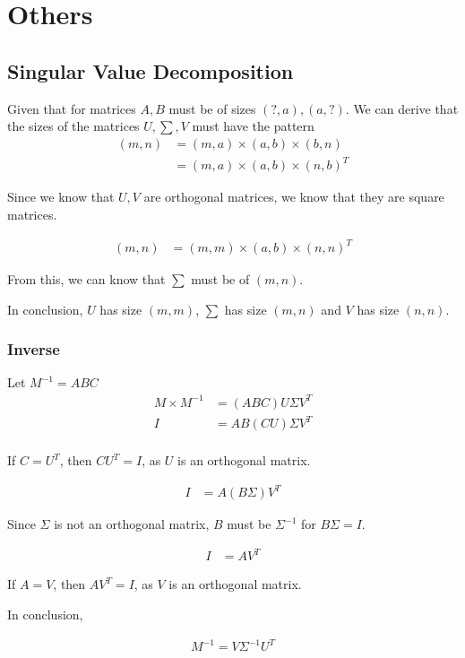 \chapter{Others}

\section{Singular Value Decomposition}

  Given that for matrices $ A, B $ must be of sizes
  $ \left( ?, a \right), \left( a, ? \right) $. We can derive that the
  sizes of the matrices $ U, \sum, V $ must have the pattern
  \begin{align*}
    \left( m, n \right)
      &= \left( m, a \right) \times \left( a, b \right) \times \left( b, n \right) \\
      &= \left( m, a \right) \times \left( a, b \right) \times \left( n, b \right)^{T}
  \end{align*}

  Since we know that $ U, V $ are orthogonal matrices, we know that they
  are square matrices.

  \begin{align*}
    \left( m, n \right)
      &= \left( m, m \right) \times \left( a, b \right) \times \left( n, n \right)^{T}
  \end{align*}

  From this, we can know that $ \sum $ must be of $ \left( m, n \right) $.

  In conclusion, $ U $ has size $ \left( m, m \right) $, $ \sum $
  has size $ \left( m, n \right) $ and $ V $ has size $ \left( n, n \right) $.

  \subsection{Inverse}

    Let $ M^{-1} = A B C $
    \begin{align*}
      M \times M^{-1} &= \left( A B C \right) U \Sigma V^{T} \\
      I &= A B \left( C U \right) \Sigma V^{T} \\
    \end{align*}

    If $ C = U^{T} $, then $ C U^{T} = I $, as $ U $ is an orthogonal matrix.

    \begin{align*}
      I &= A \left( B \Sigma \right) V^{T}
    \end{align*}

    Since $ \Sigma $ is not an orthogonal matrix, $ B $ must be $ \Sigma^{-1} $
    for $ B \Sigma = I $.

    \begin{align*}
      I &= A V^{T}
    \end{align*}

    If $ A = V $, then $ A V^{T} = I $, as $ V $ is an orthogonal matrix.

    In conclusion,

    \begin{align*}
      M^{-1} = V \Sigma^{-1} U^{T}
    \end{align*}
